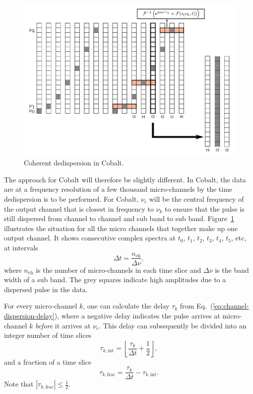 \documentclass[a4paper,twoside]{article}
\newcommand{\cobalt}{Cobalt\xspace}
\begin{document}
\begin{figure}
\begin{center}
\includegraphics[width=0.9\columnwidth]{cobalt-dedispersion.pdf}
\end{center}
\caption{Coherent dedispersion in \cobalt.}
\label{fig:coherent-dedispersion}
\end{figure}

The approach for \cobalt will therefore be slightly different. In
\cobalt, the data are at a frequency resolution of a few thousand
micro-channels by the time dedispersion is to be performed.  For
\cobalt, $\nu_\mathrm{c}$ will be the central frequency of the output
channel that is closest in frequency to $\nu_k$ to ensure that the
pulse is still dispersed from channel to channel and sub band to sub
band.  Figure~\ref{fig:coherent-dedispersion} illustrates the
situation for all the micro channels that together make up one output
channel. It shows consecutive complex spectra at $t_0$, $t_1$, $t_2$,
$t_3$, $t_4$, $t_5$, etc, at intervals
\begin{equation}
\Delta t = \frac{n_\mathrm{ch}}{\Delta \nu},
\end{equation}
where $n_\mathrm{ch}$ is the number of micro-channels in each time slice and
$\Delta\nu$ is the band width of a sub band. The grey squares indicate
high amplitudes due to a dispersed pulse in the data.

For every micro-channel $k$, one can calculate the delay $\tau_k$ from
Eq.~(\ref{eq:channel-dispersion-delay}), where a negative delay
indicates the pulse arrives at micro-channel $k$ \emph{before} it arrives at
$\nu_\mathrm{c}$. This delay can subsequently be divided into an
integer number of time slices
\begin{equation}
\tau_{k, \mathrm{int}} = \left \lfloor \frac{\tau_k}{\Delta t} + \frac{1}{2}
\right \rfloor,
\end{equation}
and a fraction of a time slice
\begin{equation}
\tau_{k, \mathrm{frac}} = \frac{\tau_k}{\Delta t} - \tau_{k, \mathrm{int}}.
\end{equation}
Note that $|\tau_{k, \mathrm{frac}}| \le \frac{1}{2}$.
\end{document}
